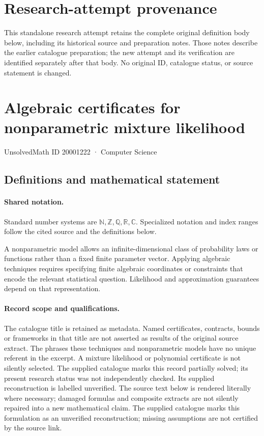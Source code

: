 \documentclass[11pt]{article}
\begin{document}
\section*{Research-attempt provenance}
This standalone research attempt retains the complete original definition body below,
including its historical source and preparation notes. Those notes describe the
earlier catalogue preparation; the new attempt and its verification are identified
separately after that body. No original ID, catalogue status, or source statement is changed.

\section{Algebraic certificates for nonparametric mixture likelihood}\label{20001222}
{\small UnsolvedMath ID 20001222 · Computer Science}
\subsection{Definitions and mathematical statement}

\paragraph{Shared notation.}Standard number systems are $\mathbb N,\mathbb Z,\mathbb Q,\mathbb R,\mathbb C$. Specialized notation and index ranges follow the cited source and the definitions below.


A nonparametric model allows an infinite-dimensional class of probability laws or functions rather than a fixed finite parameter vector. Applying algebraic techniques requires specifying finite algebraic coordinates or constraints that encode the relevant statistical question. Likelihood and approximation guarantees depend on that representation.
\paragraph{Record scope and qualifications.}
The catalogue title is retained as metadata. Named certificates, contracts, bounds or frameworks in that title are not asserted as results of the original source extract.
The phrases these techniques and nonparametric models have no unique referent in the excerpt. A mixture likelihood or polynomial certificate is not silently selected. The supplied catalogue marks this record partially solved; its present research status was not independently checked. Its supplied reconstruction is labelled unverified.
The source text below is rendered literally where necessary; damaged formulas and composite extracts are not silently repaired into a new mathematical claim.
The supplied catalogue marks this formulation as an unverified reconstruction; missing assumptions are not certified by the source link.
\end{document}
